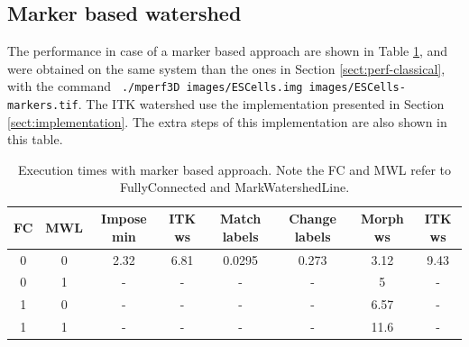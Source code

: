 \documentclass{InsightArticle}
\begin{document}
\subsection{Marker based watershed}
\label{sect:perf-marker}
The performance in case of a marker based approach are shown in Table
\ref{tbl:perf-marker}, and were obtained on the same system than the
ones in Section \ref{sect:perf-classical}, with the command {\tt 
./mperf3D images/ESCells.img images/ESCells-markers.tif}.
The ITK watershed use the implementation presented in Section
\ref{sect:implementation}. The extra steps of this implementation are
also shown in this table.

\begin{table}[htbp]
\centering
\begin{tabular}{cc|cccc|cc}
\hline
FC & MWL & Impose min &  ITK ws & Match labels & Change labels & Morph ws & ITK ws \\
\hline
\hline
0 &      0 &      2.32 &   6.81 &   0.0295 & 0.273 &  3.12 &   9.43 \\
0 &      1 &      -    &   -    &   -      & -     &  5    &   - \\
1 &      0 &      -    &   -    &   -      & -     &  6.57 &   - \\
1 &      1 &      -    &   -    &   -      & -     &  11.6 &   - \\
\hline
\end{tabular}
\caption{Execution times with marker based approach. Note the FC and MWL refer to FullyConnected and MarkWatershedLine.\label{tbl:perf-marker}}
\end{table}
\end{document}
